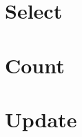 \documentclass[twoside,a4paper,smallborder=true]{refart}
\begin{document}
\section{Select}
\label{section:select}

\newpage

\section{Count}
\label{section:count}

\newpage

\section{Update}
\label{section:update}

\newpage

\printglossaries
\newpage

 
 
\printindex
\end{document}
